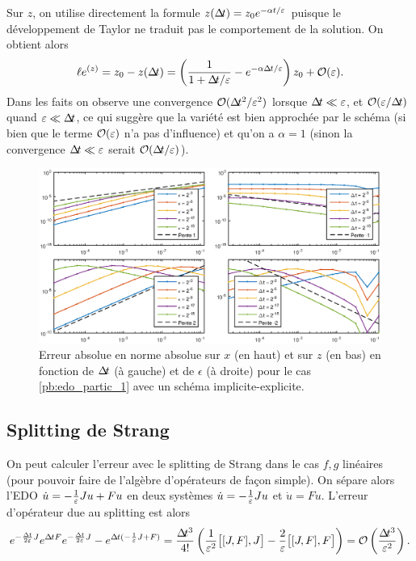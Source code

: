 Sur $z$, on utilise directement la formule $z(\Delta\!\!\!\ t) = z_0 e^{-\alpha t/\varepsilon}$ puisque le développement de Taylor ne traduit pas le comportement de la solution. On obtient alors 
$$ \lez = z_0 - z(\dt) = \left(\frac{1}{1+\dt/\epsilon} - e^{-\alpha\dt/\epsilon} \right)z_0 + \O(\epsilon). $$
Dans les faits on observe une convergence $\mathcal{O}(\Delta\!\!\!\ t^2/\varepsilon^2)$ lorsque $\Delta\!\!\!\ t\ll\varepsilon$, et $\mathcal{O}(\varepsilon/\Delta\!\!\!\ t)$ quand $\varepsilon\ll\Delta\!\!\!\ t$, ce qui suggère que la variété est bien approchée par le schéma (si bien que le terme $\mathcal{O}(\varepsilon)$ n'a pas d'influence) et qu'on a $\alpha = 1$ (sinon la convergence $\Delta\!\!\!\ t\ll\varepsilon$ serait $\mathcal{O}(\Delta\!\!\!\ t/\varepsilon)$). 
\begin{figure}[!h]
\centering
\includegraphics[width=\textwidth]{img/ann/conv_abs_imex_cas1.eps}
\caption{Erreur absolue en norme absolue sur $x$ (en haut) et sur $z$ (en bas) en fonction de $\Delta\!\!\!\ t$ (à gauche) et de $\epsilon$ (à droite) pour le cas \eqref{pb:edo_partic_1} avec un schéma implicite-explicite.}
\end{figure}

\subsection*{Splitting de Strang}

On peut calculer l'erreur avec le splitting de Strang dans le cas $f,g$ linéaires (pour pouvoir faire de l'algèbre d'opérateurs de façon simple). 
On sépare alors l'EDO $\dot{u} = -\frac{1}{\varepsilon} J u + Fu $ en deux systèmes $\dot{u} = -\frac{1}{\varepsilon} Ju$ et $\dot{u} = Fu$. 
L'erreur d'opérateur due au splitting est alors 
$$ e^{-\frac{\dt}{2\epsilon}J}e^{\dt F} e^{-\frac{\dt}{2\epsilon}J} - e^{\dt(-\inveps J + F)} = \frac{\dt^3}{4!} \left(\frac{1}{\epsilon^2}\big[[J,F],J\big] -\frac{2}{\epsilon}\big[ [J,F],F \big]\right) = \O\left(\frac{\dt^3}{\epsilon^2} \right). $$

